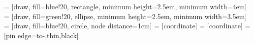 
 = [draw, fill=blue!20, rectangle, minimum height=2.5em, minimum width=4em]
 = [draw, fill=green!20, ellipse, minimum height=2.5em, minimum width=3.5em]
 = [draw, fill=blue!20, circle, node distance=1cm]
 = [coordinate]
 = [coordinate]
 = [pin edge={to-,thin,black}]
